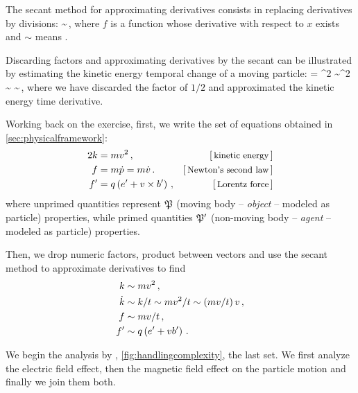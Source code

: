 The secant method for approximating derivatives consists in replacing derivatives by divisions:
%
\beq
   \sim {}\,,
\eeq
%
where $f$ is a function whose derivative with respect to $x$ exists and $\sim$ means .

Discarding factors and approximating derivatives by the secant can be illustrated by estimating the kinetic energy temporal change of a moving particle:
%
\beq
  \ekin = \mass\vel^2
        \sim\mass\vel^2
  \implies
  \dt\ekin \sim {} 
           \sim {}\,,
\eeq
%
where we have discarded the factor of $1/2$ and approximated the kinetic energy time derivative.

Working back on the exercise, first, we write the set of equations obtained in \cref{sec:physicalframework}:
%
\begin{align*}
  2\ekin  &= \mass\vel^2\,,                                   &\eqtxt{kinetic energy} \\
  \force  &= \mass\dt\mom = \mass\dt\vel\,.                   &\eqtxt{Newton's second law} \\
  \force' &= \echarge\parth{\efield' + \vel\cprod\mfield'}\,, &\eqtxt{Lorentz force}
\end{align*}
%
where unprimed quantities represent $\mathfrak{P}$ (moving body -- \emph{object} -- modeled as particle) properties, while primed quantities $\mathfrak{P}'$ (non-moving body -- \emph{agent} -- modeled as particle) properties.

Then, we drop numeric factors, product between vectors and use the secant method to approximate derivatives to find
%
\begin{align*}
  k    &\sim mv^2\,, \\
  \dot{k} &\sim k/t \sim mv^2/t \sim \left({mv/t}\right)v\,, \\
  f   &\sim mv/t\,, \\
  f'  &\sim q\left({e' + vb'}\right)\,.
\end{align*}

We begin the analysis by , \vide \cref{fig:handlingcomplexity}, the last set. We first analyze the electric field effect, then the magnetic field effect on the particle motion and finally we join them both.

